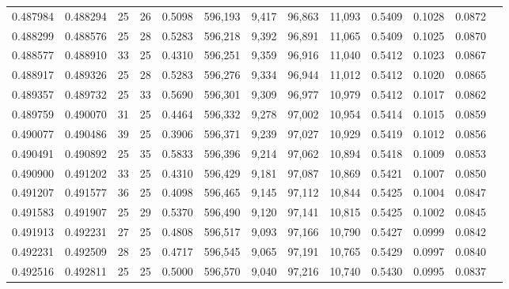 \begin{tabular}{rrrrrrrrrrrrr}
0.487984 & 0.488294 &    25 &  26 &                                     0.5098 & 596,193 &   9,417 &  96,863 &  11,093 & 0.5409 & 0.1028 & 0.0872 \\
0.488299 & 0.488576 &    25 &  28 &                                     0.5283 & 596,218 &   9,392 &  96,891 &  11,065 & 0.5409 & 0.1025 & 0.0870 \\
0.488577 & 0.488910 &    33 &  25 &                                     0.4310 & 596,251 &   9,359 &  96,916 &  11,040 & 0.5412 & 0.1023 & 0.0867 \\
0.488917 & 0.489326 &    25 &  28 &                                     0.5283 & 596,276 &   9,334 &  96,944 &  11,012 & 0.5412 & 0.1020 & 0.0865 \\
0.489357 & 0.489732 &    25 &  33 &                                     0.5690 & 596,301 &   9,309 &  96,977 &  10,979 & 0.5412 & 0.1017 & 0.0862 \\
0.489759 & 0.490070 &    31 &  25 &                                     0.4464 & 596,332 &   9,278 &  97,002 &  10,954 & 0.5414 & 0.1015 & 0.0859 \\
0.490077 & 0.490486 &    39 &  25 &                                     0.3906 & 596,371 &   9,239 &  97,027 &  10,929 & 0.5419 & 0.1012 & 0.0856 \\
0.490491 & 0.490892 &    25 &  35 &                                     0.5833 & 596,396 &   9,214 &  97,062 &  10,894 & 0.5418 & 0.1009 & 0.0853 \\
0.490900 & 0.491202 &    33 &  25 &                                     0.4310 & 596,429 &   9,181 &  97,087 &  10,869 & 0.5421 & 0.1007 & 0.0850 \\
0.491207 & 0.491577 &    36 &  25 &                                     0.4098 & 596,465 &   9,145 &  97,112 &  10,844 & 0.5425 & 0.1004 & 0.0847 \\
0.491583 & 0.491907 &    25 &  29 &                                     0.5370 & 596,490 &   9,120 &  97,141 &  10,815 & 0.5425 & 0.1002 & 0.0845 \\
0.491913 & 0.492231 &    27 &  25 &                                     0.4808 & 596,517 &   9,093 &  97,166 &  10,790 & 0.5427 & 0.0999 & 0.0842 \\
0.492231 & 0.492509 &    28 &  25 &                                     0.4717 & 596,545 &   9,065 &  97,191 &  10,765 & 0.5429 & 0.0997 & 0.0840 \\
0.492516 & 0.492811 &    25 &  25 &                                     0.5000 & 596,570 &   9,040 &  97,216 &  10,740 & 0.5430 & 0.0995 & 0.0837 \\

\end{tabular}
